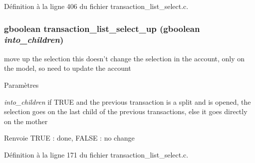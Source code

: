 Définition à la ligne 406 du fichier transaction\_\-list\_\-select.c.

\subsubsection[{transaction\_\-list\_\-select\_\-up}]{\setlength{\rightskip}{0pt plus 5cm}gboolean transaction\_\-list\_\-select\_\-up (gboolean {\em into\_\-children})}\label{transaction__list__select_8h_afe4cb2b4907b0146fd152277511c5653}
move up the selection this doesn't change the selection in the account, only on the model, so need to update the account


\begin{DoxyParams}{Paramètres}
\item[{\em into\_\-children}]if TRUE and the previous transaction is a split and is opened, the selection goes on the last child of the previous transactions, else it goes directly on the mother\end{DoxyParams}
\begin{DoxyReturn}{Renvoie}
TRUE : done, FALSE : no change 
\end{DoxyReturn}


Définition à la ligne 171 du fichier transaction\_\-list\_\-select.c.

